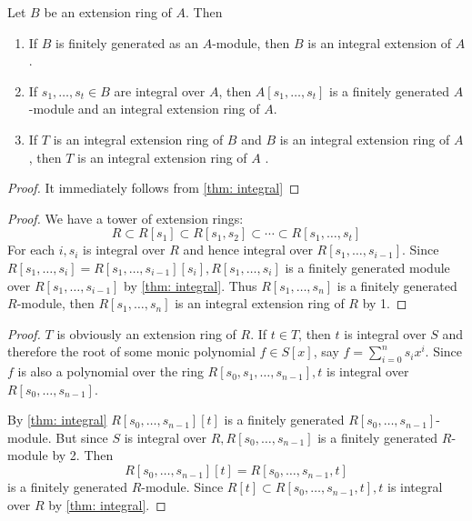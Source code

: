 \begin{corollary}
    \label{cor: integral extensions}
    Let $B$ be an extension ring of $A$. Then
    \begin{enumerate}
        \item
              If $B$ is finitely generated as an $A$-module, then $B$ is an integral extension of $A$.
        \item
              If $s_1, \ldots, s_{t} \in B$ are integral over $A$, then $A\left[s_1, \ldots, s_{t}\right]$ is a finitely generated $A$-module and an integral extension ring of $A$.
        \item
              If $T$ is an integral extension ring of $B$ and $B$ is an integral extension ring of $A$, then $T$ is an integral extension ring of $A$ .
    \end{enumerate}
    \begin{proof}
        It immediately follows from \ref{thm: integral}
    \end{proof}
    \begin{proof}
        We have a tower of extension rings:
        \begin{equation*}
            R \subset R\left[s_1\right] \subset R\left[s_1, s_2\right] \subset \cdots \subset R\left[s_1, \ldots, s_t\right]
        \end{equation*}
        For each $i, s_i$ is integral over $R$ and hence integral over $R\left[s_1, \ldots, s_{i-1}\right]$. Since $R\left[s_1, \ldots, s_i\right]=R\left[s_1, \ldots, s_{i-1}\right]\left[s_i\right], R\left[s_1, \ldots, s_i\right]$ is a finitely generated module over $R\left[s_1, \ldots, s_{i-1}\right]$ by \ref{thm: integral}.
        Thus $R\left[s_1, \ldots, s_n\right]$ is a finitely generated $R$-module, then $R\left[s_1, \ldots, s_n\right]$ is an integral extension ring of $R$ by 1.
    \end{proof}
    \begin{proof}
        $T$ is obviously an extension ring of $R$.
        If $t \in T$, then $t$ is integral over $S$ and therefore the root of some monic polynomial $f \in S[x]$, say $f=\sum_{i=0}^n s_i x^i$. Since $f$ is also a polynomial over the ring $R\left[s_0, s_1, \ldots, s_{n-1}\right], t$ is integral over $R\left[s_0, \ldots, s_{n-1}\right]$.

        By \ref{thm: integral} $R\left[s_0, \ldots, s_{n-1}\right][t]$ is a finitely generated $R\left[s_0, \ldots, s_{n-1}\right]$-module.
        But since $S$ is integral over $R, R\left[s_0, \ldots, s_{n-1}\right]$ is a finitely generated $R$-module by 2. Then
        \begin{equation*}
            R\left[s_0, \ldots, s_{n-1}\right][t]=R\left[s_0, \ldots, s_{n-1}, t\right]
        \end{equation*}
        is a finitely generated $R$-module. Since $R[t] \subset R\left[s_0, \ldots, s_{n-1}, t\right], t$ is integral over $R$ by \ref{thm: integral}.
    \end{proof}
\end{corollary}




